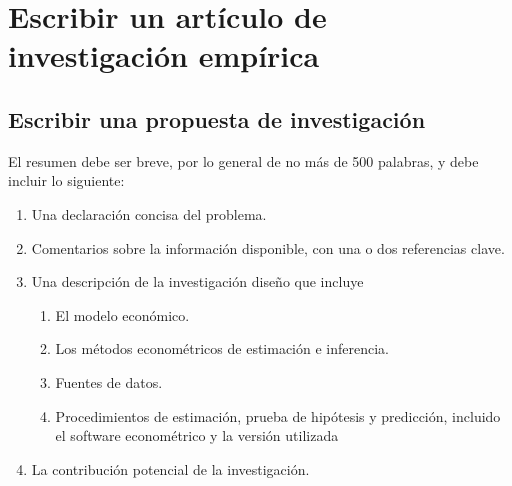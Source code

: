 \section{Escribir un artículo de investigación empírica}
\subsection{Escribir una propuesta de investigación}
El resumen debe ser breve, por lo general de no más de 500 palabras, y debe incluir lo siguiente:
\begin{enumerate}[\bfseries 1.]
    \item Una declaración concisa del problema.
    \item Comentarios sobre la información disponible, con una o dos referencias clave.
    \item Una descripción de la investigación diseño que incluye
	\begin{enumerate}[\bfseries a.]
	    \item El modelo económico.
	    \item Los métodos econométricos de estimación e inferencia.
	    \item Fuentes de datos.
	    \item Procedimientos de estimación, prueba de hipótesis y predicción, incluido el software econométrico y la versión utilizada 
	\end{enumerate}
    \item La contribución potencial de la investigación.
\end{enumerate}

